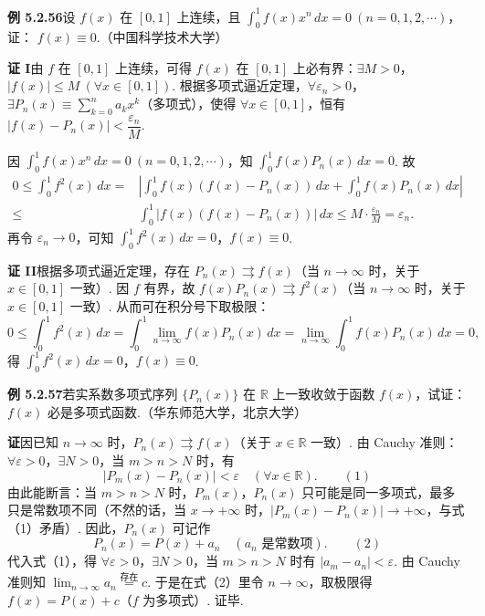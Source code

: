 \documentclass[UTF8,12pt,a4paper,fontset=fandol]{ctexart}
\begin{document}
\noindent\textbf{例 5.2.56}\quad 设 $f(x)$ 在 $[0,1]$ 上连续，且
$\displaystyle\int_0^1f(x)x^n\,dx=0\ (n=0,1,2,\cdots)$，证：
$f(x)\equiv0$.（中国科学技术大学）

\noindent\textbf{证 I}\quad 由 $f$ 在 $[0,1]$ 上连续，可得 $f(x)$ 在 $[0,1]$ 上必有界：$\exists M>0$，
$|f(x)|\le M\ (\forall x\in[0,1])$. 根据多项式逼近定理，$\forall\varepsilon_n>0$，
$\exists P_n(x)\equiv\displaystyle\sum_{k=0}^n a_kx^k$（多项式），使得 $\forall x\in[0,1]$，恒有
$|f(x)-P_n(x)|<\dfrac{\varepsilon_n}{M}$.

因 $\displaystyle\int_0^1f(x)x^n\,dx=0\ (n=0,1,2,\cdots)$，知
$\displaystyle\int_0^1f(x)P_n(x)\,dx=0$. 故
\[
\begin{aligned}
0\le\int_0^1f^2(x)\,dx
={}&\left|\int_0^1 f(x)(f(x)-P_n(x))\,dx+\int_0^1f(x)P_n(x)\,dx\right|\\
\le{}&\int_0^1|f(x)(f(x)-P_n(x))|\,dx
\le M\cdot\frac{\varepsilon_n}{M}=\varepsilon_n.
\end{aligned}
\]
再令 $\varepsilon_n\to0$，可知 $\displaystyle\int_0^1f^2(x)\,dx=0$，$f(x)\equiv0$.

\noindent\textbf{证 II}\quad 根据多项式逼近定理，存在 $P_n(x)\rightrightarrows f(x)$（当 $n\to\infty$ 时，关于
$x\in[0,1]$ 一致）. 因 $f$ 有界，故 $f(x)P_n(x)\rightrightarrows f^2(x)$（当 $n\to\infty$ 时，关于
$x\in[0,1]$ 一致）. 从而可在积分号下取极限：
\[
  0\le\int_0^1 f^2(x)\,dx
  =\int_0^1\lim_{n\to\infty}f(x)P_n(x)\,dx
  =\lim_{n\to\infty}\int_0^1f(x)P_n(x)\,dx=0,
\]
得 $\displaystyle\int_0^1f^2(x)\,dx=0$，$f(x)\equiv0$.

\noindent\textbf{例 5.2.57}\quad 若实系数多项式序列 $\{P_n(x)\}$ 在 $\mathbb R$ 上一致收敛于函数 $f(x)$，试证：
$f(x)$ 必是多项式函数.（华东师范大学，北京大学）

\noindent\textbf{证}\quad 因已知 $n\to\infty$ 时，$P_n(x)\rightrightarrows f(x)$（关于 $x\in\mathbb R$ 一致）. 由 Cauchy 准则：
$\forall\varepsilon>0$，$\exists N>0$，当 $m>n>N$ 时，有
\[
  |P_m(x)-P_n(x)|<\varepsilon\quad(\forall x\in\mathbb R).
\qquad(1)
\]
由此能断言：当 $m>n>N$ 时，$P_m(x)$，$P_n(x)$ 只可能是同一多项式，最多只是常数项不同（不然的话，当
$x\to+\infty$ 时，$|P_m(x)-P_n(x)|\to+\infty$，与式（1）矛盾）. 因此，$P_n(x)$ 可记作
\[
  P_n(x)=P(x)+a_n\quad(a_n\text{ 是常数项}).
\qquad(2)
\]
代入式（1），得 $\forall\varepsilon>0$，$\exists N>0$，当 $m>n>N$ 时有
$|a_m-a_n|<\varepsilon$. 由 Cauchy 准则知 $\displaystyle\lim_{n\to\infty}a_n\overset{\text{存在}}=c$.
于是在式（2）里令 $n\to\infty$，取极限得 $f(x)=P(x)+c$（$f$ 为多项式）. 证毕.
\end{document}
